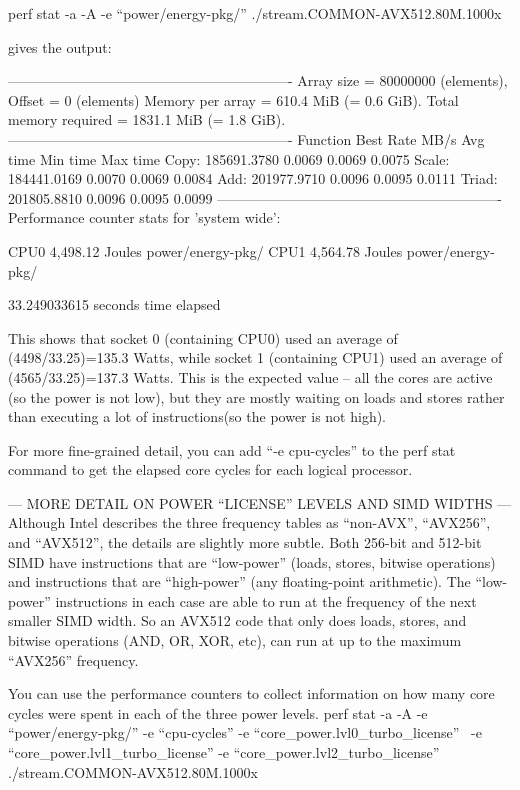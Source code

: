 perf stat -a -A -e ``power/energy-pkg/''
./stream.COMMON-AVX512.80M.1000x

gives the output:

-------------------------------------------------------------
Array size = 80000000 (elements), Offset = 0 (elements)
Memory per array = 610.4 MiB (= 0.6 GiB).
Total memory required = 1831.1 MiB (= 1.8 GiB).
-------------------------------------------------------------
Function Best Rate MB/s Avg time Min time Max time
Copy: 185691.3780 0.0069 0.0069 0.0075
Scale: 184441.0169 0.0070 0.0069 0.0084
Add: 201977.9710 0.0096 0.0095 0.0111
Triad: 201805.8810 0.0096 0.0095 0.0099
-------------------------------------------------------------
Performance counter stats for 'system wide':

CPU0 4,498.12 Joules power/energy-pkg/
CPU1 4,564.78 Joules power/energy-pkg/

33.249033615 seconds time elapsed


This shows that socket 0 (containing CPU0) used an average of
(4498/33.25)=135.3 Watts, while socket 1 (containing CPU1) used an
average of (4565/33.25)=137.3 Watts. This is the expected value -- all
the cores are active (so the power is not low), but they are mostly
waiting on loads and stores rather than executing a lot of
instructions(so the power is not high).

For more fine-grained detail, you can add ``-e cpu-cycles'' to the
perf stat command to get the elapsed core cycles for each logical
processor.


--- MORE DETAIL ON POWER ``LICENSE'' LEVELS AND SIMD WIDTHS ---
Although Intel describes the three frequency tables as ``non-AVX'',
``AVX256'', and ``AVX512'', the details are slightly more subtle.
Both 256-bit and 512-bit SIMD have instructions that are ``low-power''
(loads, stores, bitwise operations) and instructions that are
``high-power'' (any floating-point arithmetic). The ``low-power''
instructions in each case are able to run at the frequency of the next
smaller SIMD width. So an AVX512 code that only does loads, stores,
and bitwise operations (AND, OR, XOR, etc), can run at up to the
maximum ``AVX256'' frequency.

You can use the performance counters to collect information on how
many core cycles were spent in each of the three power levels.
perf stat -a -A -e ``power/energy-pkg/'' -e ``cpu-cycles'' -e
``core_power.lvl0_turbo_license'' \
-e ``core_power.lvl1_turbo_license'' -e
``core_power.lvl2_turbo_license'' ./stream.COMMON-AVX512.80M.1000x

